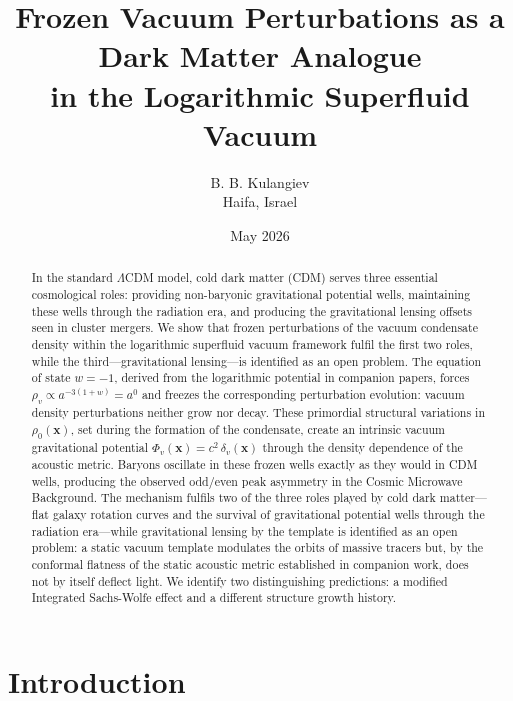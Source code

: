 \documentclass[12pt, a4paper]{article}
\begin{document}
\title{Frozen Vacuum Perturbations as a Dark Matter Analogue\\in the Logarithmic Superfluid Vacuum}

\author{B. B. Kulangiev\\\small{Haifa, Israel}}
\date{May 2026}
\maketitle

\begin{abstract}
\noindent
In the standard $\Lambda$CDM model, cold dark matter (CDM) serves three essential cosmological roles: providing non-baryonic gravitational potential wells, maintaining these wells through the radiation era, and producing the gravitational lensing offsets seen in cluster mergers. We show that frozen perturbations of the vacuum condensate density within the logarithmic superfluid vacuum framework fulfil the first two roles, while the third---gravitational lensing---is identified as an open problem. The equation of state $w = -1$, derived from the logarithmic potential in companion papers, forces $\rho_v \propto a^{-3(1+w)} = a^0$ and freezes the corresponding perturbation evolution: vacuum density perturbations neither grow nor decay. These primordial structural variations in $\rho_0(\mathbf{x})$, set during the formation of the condensate, create an intrinsic vacuum gravitational potential $\Phi_v(\mathbf{x}) = c^2\, \delta_v(\mathbf{x})$ through the density dependence of the acoustic metric. Baryons oscillate in these frozen wells exactly as they would in CDM wells, producing the observed odd/even peak asymmetry in the Cosmic Microwave Background. The mechanism fulfils two of the three roles played by cold dark matter---flat galaxy rotation curves and the survival of gravitational potential wells through the radiation era---while gravitational lensing by the template is identified as an open problem: a static vacuum template modulates the orbits of massive tracers but, by the conformal flatness of the static acoustic metric established in companion work, does not by itself deflect light. We identify two distinguishing predictions: a modified Integrated Sachs-Wolfe effect and a different structure growth history.
\end{abstract}


\section{Introduction}
\label{sec:intro}
\end{document}
